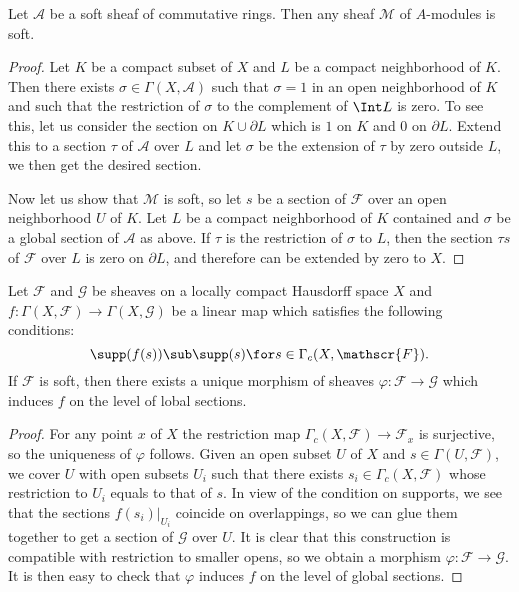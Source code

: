 \begin{proposition}\label{sheaf on LHS soft ringed module is soft}
Let $\mathscr{A}$ be a soft sheaf of commutative rings. Then any sheaf $\mathscr{M}$ of $A$-modules is soft.
\end{proposition}
\begin{proof}
Let $K$ be a compact subset of $X$ and $L$ be a compact neighborhood of $K$. Then there exists $\sigma\in\Gamma(X,\mathscr{A})$ such that $\sigma=1$ in an open neighborhood of $K$ and such that the restriction of $\sigma$ to the complement of $\Int L$ is zero. To see this, let us consider the section on $K\cup\partial L$ which is $1$ on $K$ and $0$ on $\partial L$. Extend this to a section $\tau$ of $\mathscr{A}$ over $L$ and let $\sigma$ be the extension of $\tau$ by zero outside $L$, we then get the desired section.\par
Now let us show that $\mathscr{M}$ is soft, so let $s$ be a section of $\mathscr{F}$ over an open neighborhood $U$ of $K$. Let $L$ be a compact neighborhood of $K$ contained and $\sigma$ be a global section of $\mathscr{A}$ as above. If $\tau$ is the restriction of $\sigma$ to $L$, then the section $\tau s$ of $\mathscr{F}$ over $L$ is zero on $\partial L$, and therefore can be extended by zero to $X$.
\end{proof}

\begin{proposition}\label{sheaf on LHS soft sheaf morphism extentable}
Let $\mathscr{F}$ and $\mathscr{G}$ be sheaves on a locally compact Hausdorff space $X$ and $f:\Gamma(X,\mathscr{F})\to \Gamma(X,\mathscr{G})$ be a linear map which satisfies the following conditions:
\[\supp(f(s))\sub\supp(s)\for s\in\Gamma_c(X,\mathscr{F}).\]
If $\mathscr{F}$ is soft, then there exists a unique morphism of sheaves $\varphi:\mathscr{F}\to\mathscr{G}$ which induces $f$ on the level of lobal sections.
\end{proposition}
\begin{proof}
For any point $x$ of $X$ the restriction map $\Gamma_c(X,\mathscr{F})\to \mathscr{F}_x$ is surjective, so the uniqueness of $\varphi$ follows. Given an open subset $U$ of $X$ and $s\in\Gamma(U,\mathscr{F})$, we cover $U$ with open subsets $U_i$ such that there exists $s_i\in\Gamma_c(X,\mathscr{F})$ whose restriction to $U_i$ equals to that of $s$. In view of the condition on supports, we see that the sections $f(s_i)|_{U_i}$ coincide on overlappings, so we can glue them together to get a section of $\mathscr{G}$ over $U$. It is clear that this construction is compatible with restriction to smaller opens, so we obtain a morphism $\varphi:\mathscr{F}\to\mathscr{G}$. It is then easy to check that $\varphi$ induces $f$ on the level of global sections.
\end{proof}

